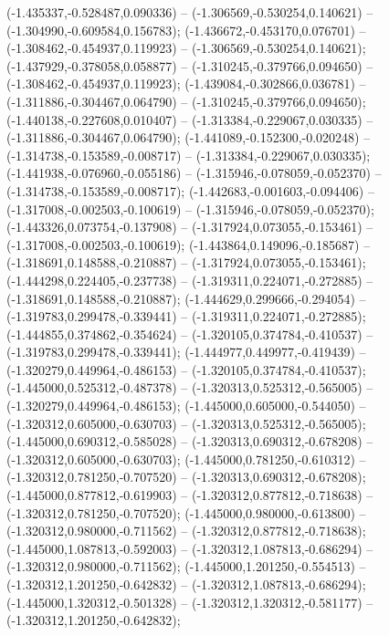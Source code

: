  (-1.435337,-0.528487,0.090336) -- (-1.306569,-0.530254,0.140621) -- (-1.304990,-0.609584,0.156783);
 (-1.436672,-0.453170,0.076701) -- (-1.308462,-0.454937,0.119923) -- (-1.306569,-0.530254,0.140621);
 (-1.437929,-0.378058,0.058877) -- (-1.310245,-0.379766,0.094650) -- (-1.308462,-0.454937,0.119923);
 (-1.439084,-0.302866,0.036781) -- (-1.311886,-0.304467,0.064790) -- (-1.310245,-0.379766,0.094650);
 (-1.440138,-0.227608,0.010407) -- (-1.313384,-0.229067,0.030335) -- (-1.311886,-0.304467,0.064790);
 (-1.441089,-0.152300,-0.020248) -- (-1.314738,-0.153589,-0.008717) -- (-1.313384,-0.229067,0.030335);
 (-1.441938,-0.076960,-0.055186) -- (-1.315946,-0.078059,-0.052370) -- (-1.314738,-0.153589,-0.008717);
 (-1.442683,-0.001603,-0.094406) -- (-1.317008,-0.002503,-0.100619) -- (-1.315946,-0.078059,-0.052370);
 (-1.443326,0.073754,-0.137908) -- (-1.317924,0.073055,-0.153461) -- (-1.317008,-0.002503,-0.100619);
 (-1.443864,0.149096,-0.185687) -- (-1.318691,0.148588,-0.210887) -- (-1.317924,0.073055,-0.153461);
 (-1.444298,0.224405,-0.237738) -- (-1.319311,0.224071,-0.272885) -- (-1.318691,0.148588,-0.210887);
 (-1.444629,0.299666,-0.294054) -- (-1.319783,0.299478,-0.339441) -- (-1.319311,0.224071,-0.272885);
 (-1.444855,0.374862,-0.354624) -- (-1.320105,0.374784,-0.410537) -- (-1.319783,0.299478,-0.339441);
 (-1.444977,0.449977,-0.419439) -- (-1.320279,0.449964,-0.486153) -- (-1.320105,0.374784,-0.410537);
 (-1.445000,0.525312,-0.487378) -- (-1.320313,0.525312,-0.565005) -- (-1.320279,0.449964,-0.486153);
 (-1.445000,0.605000,-0.544050) -- (-1.320312,0.605000,-0.630703) -- (-1.320313,0.525312,-0.565005);
 (-1.445000,0.690312,-0.585028) -- (-1.320313,0.690312,-0.678208) -- (-1.320312,0.605000,-0.630703);
 (-1.445000,0.781250,-0.610312) -- (-1.320312,0.781250,-0.707520) -- (-1.320313,0.690312,-0.678208);
 (-1.445000,0.877812,-0.619903) -- (-1.320312,0.877812,-0.718638) -- (-1.320312,0.781250,-0.707520);
 (-1.445000,0.980000,-0.613800) -- (-1.320312,0.980000,-0.711562) -- (-1.320312,0.877812,-0.718638);
 (-1.445000,1.087813,-0.592003) -- (-1.320312,1.087813,-0.686294) -- (-1.320312,0.980000,-0.711562);
 (-1.445000,1.201250,-0.554513) -- (-1.320312,1.201250,-0.642832) -- (-1.320312,1.087813,-0.686294);
 (-1.445000,1.320312,-0.501328) -- (-1.320312,1.320312,-0.581177) -- (-1.320312,1.201250,-0.642832);
